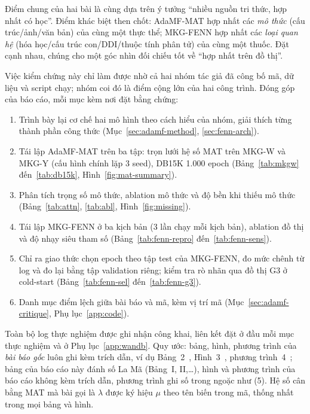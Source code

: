 \documentclass[conference]{IEEEtran}
\begin{document}
Điểm chung của hai bài là cùng dựa trên ý tưởng ``nhiều nguồn tri thức, hợp nhất
có học''. Điểm khác biệt then chốt: AdaMF-MAT hợp nhất các \emph{mô thức}
(cấu trúc/ảnh/văn bản) của cùng một thực thể; MKG-FENN hợp nhất các \emph{loại
quan hệ} (hóa học/cấu trúc con/DDI/thuộc tính phân tử) của cùng một thuốc. Đặt
cạnh nhau, chúng cho một góc nhìn đối chiếu tốt về ``hợp nhất trên đồ thị''.

Việc kiểm chứng này chỉ làm được nhờ cả hai nhóm tác giả đã công bố mã, dữ liệu và script
chạy; nhóm coi đó là điểm cộng lớn của hai công trình. Đóng góp của báo cáo, mỗi mục kèm nơi đặt
bằng chứng:
\begin{enumerate}
  \item Trình bày lại cơ chế hai mô hình theo cách hiểu của nhóm, giải thích từng thành phần công
  thức (Mục~\ref{sec:adamf-method}, \ref{sec:fenn-arch}).
  \item Tái lập AdaMF-MAT trên ba tập: trọn lưới hệ số MAT trên MKG-W và MKG-Y (cấu hình chính lặp 3 seed), DB15K
  1.000 epoch (Bảng~\ref{tab:mkgw} đến~\ref{tab:db15k}, Hình~\ref{fig:mat-summary}).
  \item Phân tích trọng số mô thức, ablation mô thức và độ bền khi thiếu mô thức
  (Bảng~\ref{tab:attn}, \ref{tab:abl}, Hình~\ref{fig:missing}).
  \item Tái lập MKG-FENN ở ba kịch bản (3 lần chạy mỗi kịch bản), ablation đồ thị và độ nhạy siêu
  tham số (Bảng~\ref{tab:fenn-repro} đến~\ref{tab:fenn-sens}).
  \item Chỉ ra giao thức chọn epoch theo tập test của MKG-FENN, đo mức chênh từ log và đo lại bằng
  tập validation riêng; kiểm tra rò nhãn qua đồ thị G3 ở cold-start (Bảng~\ref{tab:fenn-sel}
  đến~\ref{tab:fenn-g3}).
  \item Danh mục điểm lệch giữa bài báo và mã, kèm vị trí mã (Mục~\ref{sec:adamf-critique}, Phụ
  lục~\ref{app:code}).
\end{enumerate}
Toàn bộ log thực nghiệm được ghi nhận công khai, liên kết đặt ở đầu mỗi mục thực nghiệm và ở Phụ
lục~\ref{app:wandb}. Quy ước: bảng, hình, phương trình của \emph{bài báo gốc} luôn ghi kèm trích dẫn, ví dụ Bảng~2~\cite{adamfmat},
Hình~3~\cite{adamfmat}, phương trình~4~\cite{adamfmat}; bảng của báo cáo này đánh số La Mã (Bảng~I, II,\dots), hình và
phương trình của báo cáo không kèm trích dẫn, phương trình ghi số trong ngoặc như (5). Hệ số cân bằng MAT mà bài
gọi là $\lambda$ được ký hiệu $\mu$ theo tên biến trong mã, thống nhất trong mọi bảng và hình.

\end{document}
